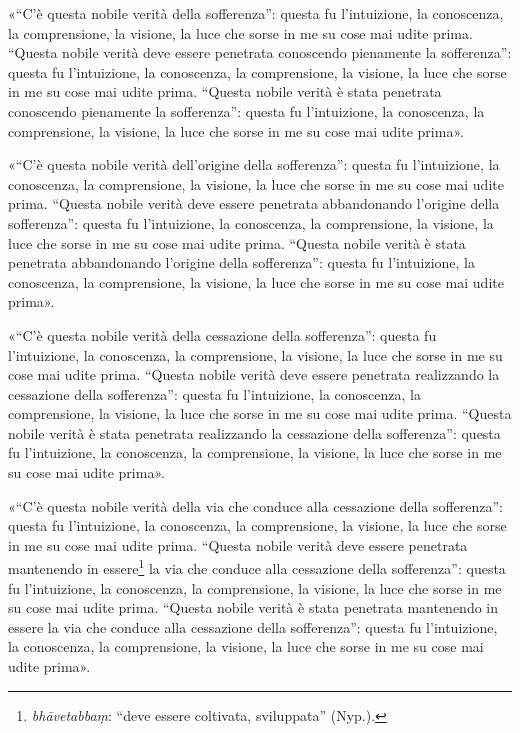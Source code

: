 «“C’è questa nobile verità della sofferenza”: questa fu l’intuizione, la
conoscenza, la comprensione, la visione, la luce che sorse in me su cose
mai udite prima. “Questa nobile verità deve essere penetrata conoscendo
pienamente la sofferenza”: questa fu l’intuizione, la conoscenza, la
comprensione, la visione, la luce che sorse in me su cose mai udite
prima. “Questa nobile verità è stata penetrata conoscendo pienamente la
sofferenza”: questa fu l’intuizione, la conoscenza, la comprensione, la
visione, la luce che sorse in me su cose mai udite prima».


«“C’è questa nobile verità dell’origine della sofferenza”: questa fu
l’intuizione, la conoscenza, la comprensione, la visione, la luce che
sorse in me su cose mai udite prima. “Questa nobile verità deve essere
penetrata abbandonando l’origine della sofferenza”: questa fu
l’intuizione, la conoscenza, la comprensione, la visione, la luce che
sorse in me su cose mai udite prima. “Questa nobile verità è stata
penetrata abbandonando l’origine della sofferenza”: questa fu
l’intuizione, la conoscenza, la comprensione, la visione, la luce che
sorse in me su cose mai udite prima».


«“C’è questa nobile verità della cessazione della sofferenza”: questa fu
l’intuizione, la conoscenza, la comprensione, la visione, la luce che
sorse in me su cose mai udite prima. “Questa nobile verità deve essere
penetrata realizzando la cessazione della sofferenza”: questa fu
l’intuizione, la conoscenza, la comprensione, la visione, la luce che
sorse in me su cose mai udite prima. “Questa nobile verità è stata
penetrata realizzando la cessazione della sofferenza”: questa fu
l’intuizione, la conoscenza, la comprensione, la visione, la luce che
sorse in me su cose mai udite prima».


«“C’è questa nobile verità della via che conduce alla cessazione della
sofferenza”: questa fu l’intuizione, la conoscenza, la comprensione, la
visione, la luce che sorse in me su cose mai udite prima. “Questa nobile
verità deve essere penetrata mantenendo in essere\footnote{\emph{bhāvetabbaṃ}: “deve essere coltivata, sviluppata” (Nyp.).} la
via che conduce alla cessazione della sofferenza”: questa fu
l’intuizione, la conoscenza, la comprensione, la visione, la luce che
sorse in me su cose mai udite prima. “Questa nobile verità è stata
penetrata mantenendo in essere la via che conduce alla cessazione della
sofferenza”: questa fu l’intuizione, la conoscenza, la comprensione, la
visione, la luce che sorse in me su cose mai udite prima».


